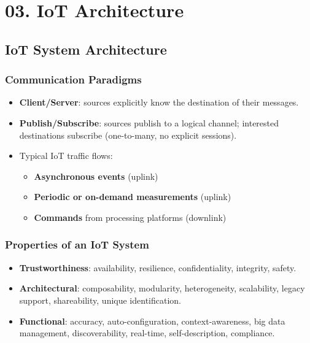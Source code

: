 \chapter{03. IoT Architecture}

\section{IoT System Architecture}

\subsection{Communication Paradigms}
\begin{itemize}
    \item \textbf{Client/Server}: sources explicitly know the destination of their messages.
    \item \textbf{Publish/Subscribe}: sources publish to a logical channel; interested destinations subscribe (one-to-many, no explicit sessions).
    \item Typical IoT traffic flows:
    \begin{itemize}
        \item \textbf{Asynchronous events} (uplink)
        \item \textbf{Periodic or on-demand measurements} (uplink)
        \item \textbf{Commands} from processing platforms (downlink)
    \end{itemize}
\end{itemize}

\subsection{Properties of an IoT System}
\begin{itemize}
    \item \textbf{Trustworthiness}: availability, resilience, confidentiality, integrity, safety.
    \item \textbf{Architectural}: composability, modularity, heterogeneity, scalability, legacy support, shareability, unique identification.
    \item \textbf{Functional}: accuracy, auto-configuration, context-awareness, big data management, discoverability, real-time, self-description, compliance.
\end{itemize}

